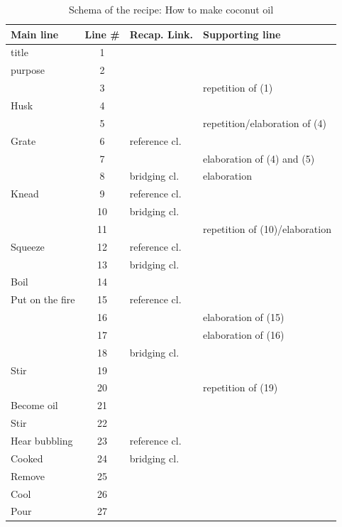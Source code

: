 \documentclass[output=paper]{LSP/langsci}
\begin{document}
\begin{table}[]
\caption{Schema of the recipe: How to make coconut oil}
\label{GuTable2}
\begin{tabular}{lcll}
\textbf{Main line}       & \textbf{Line \#} &   \textbf{Recap. Link.}              & \textbf{Supporting line} \\ \hline
title              & 1     &                 &            \\
purpose         & 2     &                 &                 \\
                & 3     &                 & repetition of (1)      \\
Husk            & 4     &                 &                 \\
                & 5     &                 & repetition/elaboration of (4)     \\
Grate           & 6     & reference cl.                &                 \\
                & 7     &                 & elaboration of (4) and (5)     \\
                & 8     & bridging cl.  & elaboration     \\
Knead           & 9     &  reference cl.               &                 \\
                & 10     & bridging cl. &                 \\
         & 11     &                 & repetition of (10)/elaboration     \\
Squeeze                & 12     &  reference cl.               &                 \\
                & 13     & bridging cl. &                 \\
Boil            & 14     &                 &                 \\
Put on the fire & 15     & reference cl.                &                 \\
                & 16     &                 & elaboration of (15)   \\
                & 17     &                 & elaboration  of (16)   \\
                & 18     & bridging cl. &                 \\
Stir            & 19     &                 &                 \\
                & 20     &                 & repetition  of (19)    \\
Become oil      & 21     &                 &                 \\
 Stir          & 22     &                &       \\
Hear bubbling   & 23     & reference cl.                  &                 \\
Cooked          & 24     & bridging cl. &                              \\
Remove          & 25     &                 &                 \\
Cool            & 26     &                 &                 \\
Pour            & 27     &                 &                
\end{tabular}
\end{table}
\end{document}
